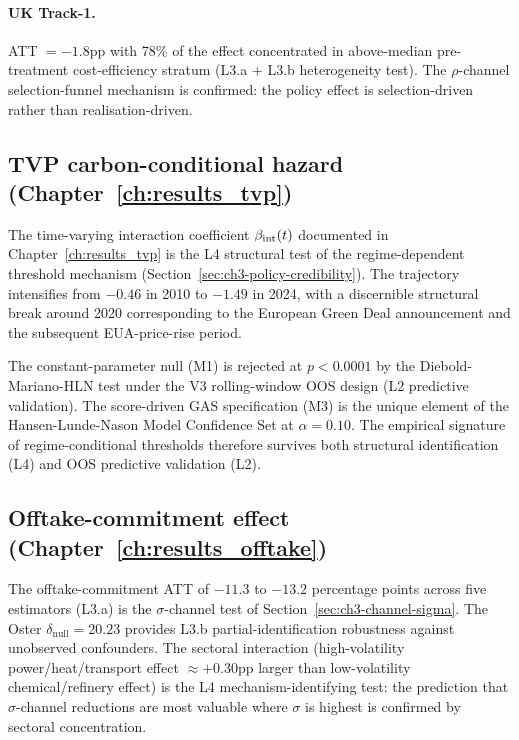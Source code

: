 \paragraph{UK Track-1.} ATT $= -1.8$pp with 78\% of the effect concentrated in above-median pre-treatment cost-efficiency stratum (L3.a + L3.b heterogeneity test). The $\rho$-channel selection-funnel mechanism is confirmed: the policy effect is selection-driven rather than realisation-driven.

\subsection{TVP carbon-conditional hazard (Chapter~\ref{ch:results_tvp})}
\label{sec:ch3-conn-tvp}

The time-varying interaction coefficient $\beta_{\mathrm{int}}(t)$ documented in Chapter~\ref{ch:results_tvp} is the L4 structural test of the regime-dependent threshold mechanism (Section~\ref{sec:ch3-policy-credibility}). The trajectory intensifies from $-0.46$ in 2010 to $-1.49$ in 2024, with a discernible structural break around 2020 corresponding to the European Green Deal announcement and the subsequent EUA-price-rise period.

The constant-parameter null (M1) is rejected at $p < 0.0001$ by the Diebold-Mariano-HLN test under the V3 rolling-window OOS design (L2 predictive validation). The score-driven GAS specification (M3) is the unique element of the Hansen-Lunde-Nason Model Confidence Set at $\alpha = 0.10$. The empirical signature of regime-conditional thresholds therefore survives both structural identification (L4) and OOS predictive validation (L2).

\subsection{Offtake-commitment effect (Chapter~\ref{ch:results_offtake})}
\label{sec:ch3-conn-offtake}

The offtake-commitment ATT of $-11.3$ to $-13.2$ percentage points across five estimators (L3.a) is the $\sigma$-channel test of Section~\ref{sec:ch3-channel-sigma}. The Oster $\delta_{\text{null}} = 20.23$ provides L3.b partial-identification robustness against unobserved confounders. The sectoral interaction (high-volatility power/heat/transport effect $\approx +0.30$pp larger than low-volatility chemical/refinery effect) is the L4 mechanism-identifying test: the prediction that $\sigma$-channel reductions are most valuable where $\sigma$ is highest is confirmed by sectoral concentration.

